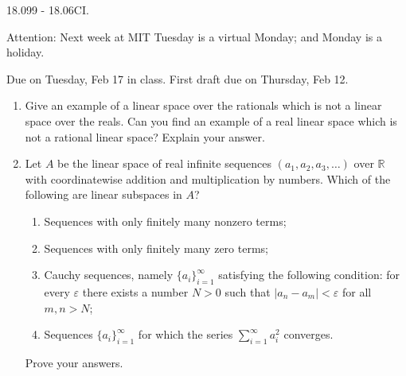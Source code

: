 \documentclass[11pt]{amsart}
\begin{document}
\thispagestyle{empty}

{\Large  18.099 - 18.06CI.} 

\vspace{1cm} 
{\large Attention: Next week at MIT Tuesday is a virtual Monday; and 
Monday is a holiday.} 
 

{Due on Tuesday, Feb 17 in class. 
First draft due on Thursday, Feb 12}.

\vspace{1cm}
 

\begin{enumerate}

\item{Give an example of a linear space over the rationals which is 
not a linear space over the reals. Can you find an example of a real 
linear space which is not a rational linear space? Explain your answer.}

\item{Let $A$ be the linear space of real infinite sequences 
$(a_1, a_2, a_3, \ldots)$ 
over ${\mathbb R}$ with coordinatewise addition and multiplication by 
numbers. Which of the following 
are linear subspaces in $A$? 
\begin{enumerate} 
   \item{Sequences with only finitely many nonzero terms;} 
   \item{Sequences with only finitely many zero terms;}
   \item{Cauchy sequences, namely $\{a_i\}_{i=1}^\infty$ satisfying the 
following condition:  
    for every $\varepsilon$ there exists
 a number $N>0$ such that $|a_n -a_m| < \varepsilon $ for all $m,n >N$;}  
   \item{Sequences  $\{a_i\}_{i=1}^\infty$ for which 
   the series $\sum_{i=1}^\infty a_i^2$ converges.}  
\end{enumerate} 
Prove your answers.}

\end{enumerate} 
\end{document}
